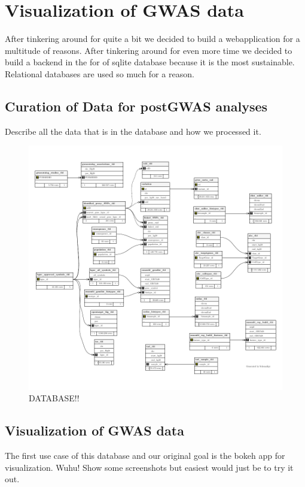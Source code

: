 \section{Visualization of GWAS data}
After tinkering around for quite a bit we decided to build a webapplication for a multitude of reasons.
After tinkering around for even more time we decided to build a backend in the for of sqlite database because it is the most sustainable. Relational databases are used so much for a reason.

    \subsection{Curation of Data for postGWAS analyses}
    Describe all the data that is in the database and how we processed it.

    \begin{figure}[htbp]
    \capstart
        \centering
    	\includegraphics{Abbildung/db-schema.pdf}

    	\begin{minipage}{\captionwidth}
    		\caption[database]{ \newline DATABASE!!}
    		\label{fig:db}
    	\end{minipage}
    \end{figure}

    \subsection{Visualization of GWAS data}
    \label{subsec:result_vis}
    The first use case of this database and our original goal is the bokeh app for visualization. Wuhu!
    Show some screenshots but easiest would just be to try it out.

